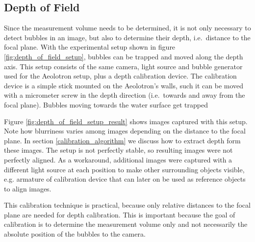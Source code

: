 		\subsection{Depth of Field}\label{sub:depth_of_field_setup}
			Since the measurement volume needs to be determined, it is not only necessary to detect bubbles in an image, but also to determine their depth, i.e.\ distance to the focal plane. With the experimental setup shown in figure \ref{fig:depth_of_field_setup}, bubbles can be trapped and moved along the depth axis. This setup consists of the same camera, light source and bubble generator used for the Aeolotron setup, plus a depth calibration device. The calibration device is a simple stick mounted on the Aeolotron's walls, such it can be moved with a micrometer screw in the depth direction (i.e.\ towards and away from the focal plane). Bubbles moving towards the water surface get trapped 
			
			Figure \ref{fig:depth_of_field_setup_result} shows images captured with this setup. Note how blurriness varies among images depending on the distance to the focal plane. In section \ref{calibration_algorithm} we discuss how to extract depth form these images. The setup is not perfectly stable, so resulting images were not perfectly aligned. As a workaround, additional images were captured with a different light source at each position to make other surrounding objects visible, e.g. armature of calibration device that can later on be used as reference objects to align images. 
			
			This calibration technique is practical, because only relative distances to the focal plane are needed for depth calibration. This is important because the goal of calibration is to determine the measurement volume only and not necessarily the absolute position of the bubbles to the camera. 
			
